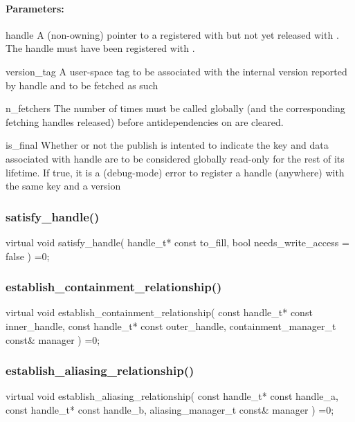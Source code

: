 \paragraph{Parameters:} 
\begin{compactdesc}
\item[handle] A (non-owning) pointer to a  registered with  but
       not yet released with .  The handle must have been registered with .
\item[version\_tag] A user-space tag to be associated with the internal version reported by handle
       and to be fetched as such
\item[n\_fetchers] The number of times  must be called globally (and the corresponding
      fetching handles released) before antidependencies on  are cleared.
\item[is\_final] Whether or not the publish is intented to indicate the key and data associated with
       handle are to be considered globally read-only for the rest of its lifetime.  If true, it is a (debug-mode)
       error to register a handle (anywhere) with the same key and a version 
\end{compactdesc}


\subsubsection{satisfy\_handle()}
\begin{CppCode}
    virtual void
    satisfy_handle(
      handle_t* const to_fill,
      bool needs_write_access = false
    ) =0;
\end{CppCode}


\subsubsection{establish\_containment\_relationship()}
\begin{CppCode}
    virtual void
    establish_containment_relationship(
      const handle_t* const inner_handle,
      const handle_t* const outer_handle,
      containment_manager_t const& manager
    ) =0;
\end{CppCode}

\subsubsection{establish\_aliasing\_relationship()}
\begin{CppCode}
    virtual void
    establish_aliasing_relationship(
      const handle_t* const handle_a,
      const handle_t* const handle_b,
      aliasing_manager_t const& manager
    ) =0;
\end{CppCode}

